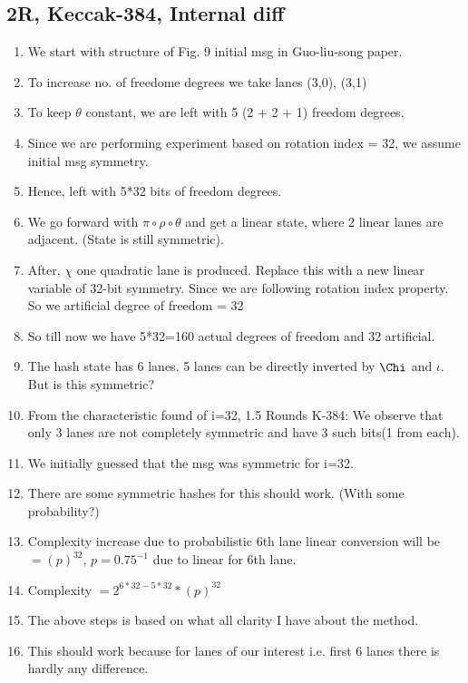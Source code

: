 \documentclass{article}
\begin{document}
\subsection{2R, Keccak-384, Internal diff}
\begin{enumerate}
    \item We start with structure of Fig. 9 initial msg in Guo-liu-song paper.
    \item To increase no. of freedome degrees we take lanes (3,0), (3,1)
    \item To keep $\theta$ constant, we are left with 5 (2 + 2 + 1) freedom degrees.
    \item Since we are performing experiment based on rotation index = 32, we assume initial msg symmetry.
    \item Hence, left with 5*32 bits of freedom degrees.
    \item We go forward with $\pi \circ \rho \circ \theta$ and get a linear state, where 2 linear lanes are adjacent. (State is still symmetric).
    \item After, $\chi$ one quadratic lane is produced. Replace this with a new linear variable of 32-bit symmetry. Since we are following rotation index property. So we artificial degree of freedom = 32
    \item So till now we have 5*32=160 actual degrees of freedom and 32 artificial.
    \item The hash state has 6 lanes. 5 lanes can be directly inverted by $\Chi$ and $\iota$. But is this symmetric?
    \item From the characteristic found of i=32, 1.5 Rounds K-384: We observe that only 3 lanes are not completely symmetric and have 3 such bits(1 from each).
    \item We initially guessed that the msg was symmetric for i=32.
    \item There are some symmetric hashes for this should work. (With some probability?)
    \item Complexity increase due to probabilistic 6th lane linear conversion will be $ = (p)^{32}$, $p = 0.75^{-1}$ due to linear for 6th lane.
    \item Complexity $ = 2^{6*32 - 5*32} * (p)^{32} $
    \item The above steps is based on what all clarity I have about the method.
    \item This should work because for lanes of our interest i.e. first 6 lanes there is hardly any difference.
\end{enumerate}
\end{document}
